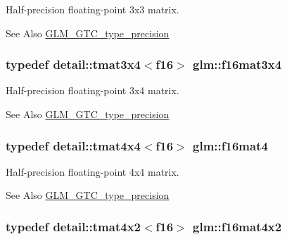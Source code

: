 Half-\/precision floating-\/point 3x3 matrix. 

\begin{DoxySeeAlso}{See Also}
\hyperlink{group__gtc__type__precision}{G\-L\-M\-\_\-\-G\-T\-C\-\_\-type\-\_\-precision} 
\end{DoxySeeAlso}
\hypertarget{group__gtc__type__precision_gaebfd661385fe915a713b91654169a455}{
\subsubsection[{f16mat3x4}]{\setlength{\rightskip}{0pt plus 5cm}typedef detail\-::tmat3x4$<$f16$>$ {\bf glm\-::f16mat3x4}}}\label{group__gtc__type__precision_gaebfd661385fe915a713b91654169a455}


Half-\/precision floating-\/point 3x4 matrix. 

\begin{DoxySeeAlso}{See Also}
\hyperlink{group__gtc__type__precision}{G\-L\-M\-\_\-\-G\-T\-C\-\_\-type\-\_\-precision} 
\end{DoxySeeAlso}
\hypertarget{group__gtc__type__precision_gab8417233c8f428e6e46bf77c7fc11200}{
\subsubsection[{f16mat4}]{\setlength{\rightskip}{0pt plus 5cm}typedef detail\-::tmat4x4$<$f16$>$ {\bf glm\-::f16mat4}}}\label{group__gtc__type__precision_gab8417233c8f428e6e46bf77c7fc11200}


Half-\/precision floating-\/point 4x4 matrix. 

\begin{DoxySeeAlso}{See Also}
\hyperlink{group__gtc__type__precision}{G\-L\-M\-\_\-\-G\-T\-C\-\_\-type\-\_\-precision} 
\end{DoxySeeAlso}
\hypertarget{group__gtc__type__precision_ga1f933a7c0b489807dc22537b80f2e5f2}{
\subsubsection[{f16mat4x2}]{\setlength{\rightskip}{0pt plus 5cm}typedef detail\-::tmat4x2$<$f16$>$ {\bf glm\-::f16mat4x2}}}\label{group__gtc__type__precision_ga1f933a7c0b489807dc22537b80f2e5f2}


